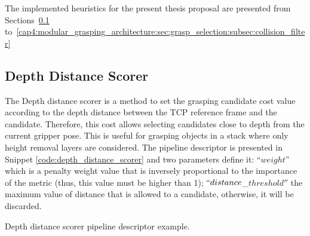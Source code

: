 

The implemented heuristics for the present thesis proposal are presented from Sections~\ref{cap4:modular_grasping_architecture:sec:grasp_selection:subsec:depth_distance} to~\ref{cap4:modular_grasping_architecture:sec:grasp_selection:subsec:collision_filter}

\subsection{Depth Distance Scorer}
\label{cap4:modular_grasping_architecture:sec:grasp_selection:subsec:depth_distance}

The Depth distance scorer is a method to set the grasping candidate cost value according to the depth distance between the TCP  reference frame and the candidate. Therefore, this cost allows selecting candidates close to depth from the current gripper pose. This is useful for grasping objects in a stack where only height removal layers are considered. The pipeline descriptor is presented in Snippet \ref{code:depth_distance_scorer} and two parameters define it: ``$weight$'' which is a penalty weight value that is inversely proportional to the importance of the metric (thus, this value must be higher than 1); $``distance$\_$threshold''$ the maximum value of distance that is allowed to a candidate, otherwise, it will be discarded.



\begin{snippet}[h!]
\centering
{}
\caption{Depth distance scorer pipeline descriptor example.}
\label{code:depth_distance_scorer}
\end{snippet}

